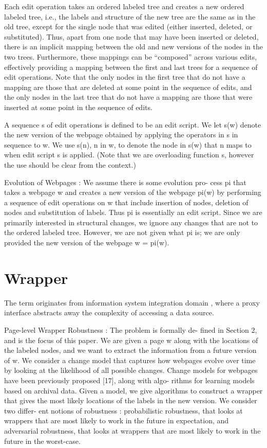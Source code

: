 Each edit operation takes an ordered labeled tree and creates a
new ordered labeled tree, i.e., the labels and structure of the new
tree are the same as in the old tree, except for the single node that
was edited (either inserted, deleted, or substituted). Thus, apart
from one node that may have been inserted or deleted, there is an
implicit mapping between the old and new versions of the nodes
in the two trees. Furthermore, these mappings can be “composed”
across various edits, effectively providing a mapping between the
first and last trees for a sequence of edit operations. Note that the
only nodes in the first tree that do not have a mapping are those
that are deleted at some point in the sequence of edits, and the only
nodes in the last tree that do not have a mapping are those that were
inserted at some point in the sequence of edits.

A sequence s of edit operations is defined to be an edit script.
We let s(w) denote the new version of the webpage obtained by
applying the operators in s in sequence to w. We use s(n), n in w,
to denote the node in s(w) that n maps to when edit script s is
applied. (Note that we are overloading function s, however the use
should be clear from the context.)

Evolution of Webpages : We assume there is some evolution pro-
cess pi that takes a webpage w and creates a new version of the
webpage pi(w) by performing a sequence of edit operations on w
that include insertion of nodes, deletion of nodes and substitution of
labels. Thus pi is essentially an edit script. Since we are primarily
interested in structural changes, we ignore any changes that are not
to the ordered labeled tree. However, we are not given what pi is;
we are only provided the new version of the webpage w = pi(w).

\section{Wrapper}

The term originates from information system integration domain \cite{Chang:2006:SWI:1159162.1159300}, where a proxy interface abstracts away the complexity of accessing a data source. 


Page-level Wrapper Robustness : The problem is formally de-
fined in Section 2, and is the focus of this paper. We are given a
page w along with the locations of the labeled nodes, and we want
to extract the information from a future version of w. We consider
a change model that captures how webpages evolve over time by
looking at the likelihood of all possible changes. Change models
for webpages have been previously proposed [17], along with algo-
rithms for learning models based on archival data. Given a model,
we give algorithms to construct a wrapper that gives the most likely
locations of the labels in the new version. We consider two differ-
ent notions of robustness : probabilistic robustness, that looks at
wrappers that are most likely to work in the future in expectation,
and adversarial robustness, that looks at wrappers that are most
likely to work in the future in the worst-case.

